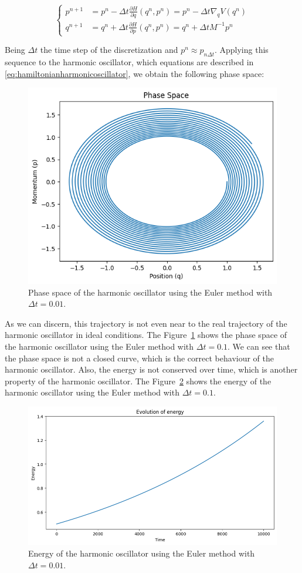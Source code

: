\documentclass{article}
\begin{document}
\begin{equation}
	\begin{cases}
		p^{n+1} &= p^n - \Delta t \frac{\partial H}{\partial q}(q^n, p^n) = p^n - \Delta t \nabla_q V(q^n) \\
		q^{n+1} &= q^n + \Delta t \frac{\partial H}{\partial p}(q^n, p^n) = q^n + \Delta t M^{-1} p^n
	\end{cases}
	\label{eq:euler}
\end{equation}

Being \(\Delta t\) the time step of the discretization and $p^n \approx p_{n\Delta t}$. Applying this sequence to the harmonic oscillator, which equations are described in \eqref{eq:hamiltonianharmonicoscillator}, we obtain the following phase space:

\begin{figure}[H]
	\centering
	\includegraphics[width=0.5\linewidth]{./Figures/Sympletic/eulerphase1.png}
	\caption{Phase space of the harmonic oscillator using the Euler method with \(\Delta t = 0.01\).}
	\label{fig:hamiltonianharmonicoscillator}
\end{figure}

As we can discern, this trajectory is not even near to the real trajectory of the harmonic oscillator in ideal conditions. The Figure~\ref{fig:hamiltonianharmonicoscillator} shows the phase space of the harmonic oscillator using the Euler method with \(\Delta t = 0.1\). We can see that the phase space is not a closed curve, which is the correct behaviour of the harmonic oscillator. Also, the energy is not conserved over time, which is another property of the harmonic oscillator. The Figure~\ref{fig:hamiltonianharmonicoscillatorenergy} shows the energy of the harmonic oscillator using the Euler method with \(\Delta t = 0.1\).

\begin{figure}[H]
	\centering
	\includegraphics[width=0.5\linewidth]{./Figures/Sympletic/eulerenergy1.png}
	\caption{Energy of the harmonic oscillator using the Euler method with \(\Delta t = 0.01\).}
	\label{fig:hamiltonianharmonicoscillatorenergy}
\end{figure}
\end{document}
